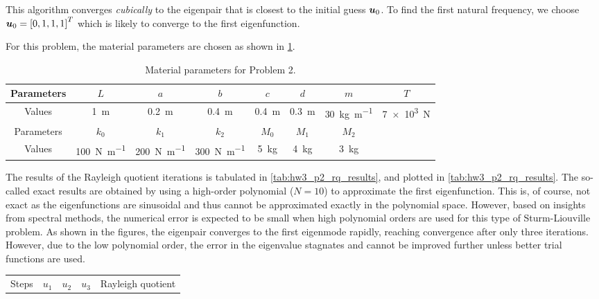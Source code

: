 \begin{enumerate}[(i)]
{    This algorithm converges \emph{cubically} to the eigenpair that is closest to the initial guess $\bm{u}_0$.
    To find the first natural frequency, we choose $\bm{u}_0 = {[0, 1, 1, 1]}^T$ which is likely to converge to the first eigenfunction.

    For this problem, the material parameters are chosen as shown in \cref{tab:hw3_p2_params}.
    \begin{table}[!ht]
        \centering
        \begin{tabular}{|c|c|c|c|c|c|c|c|}
            \hline
            Parameters & $L$ & $a$ & $b$ & $c$ & $d$ & $m$ & $T$ \\
            \hline
            Values & \qty{1}{\m} & \qty{0.2}{\m} & \qty{0.4}{\m} & \qty{0.4}{\m} & \qty{0.3}{\m} & \qty{30}{\kg\per\m} & \qty{7e3}{\newton} \\
            \hline
            Parameters & $k_0$ & $k_1$ & $k_2$ & $M_0$ & $M_1$ & $M_2$ & \\
            \hline 
            Values & \qty{100}{\newton\per\m} & \qty{200}{\newton\per\m} & \qty{300}{\newton\per\m} & \qty{5}{\kg} & \qty{4}{\kg} & \qty{3}{\kg} &  \\
            \hline
        \end{tabular}
        \caption{Material parameters for Problem 2. }
        \label{tab:hw3_p2_params}
    \end{table}
    The results of the Rayleigh quotient iterations is tabulated in \cref{tab:hw3_p2_rq_results}, and plotted in \cref{tab:hw3_p2_rq_results}.
    The so-called exact results are obtained by using a high-order polynomial ($N = 10$) to approximate the first eigenfunction. 
    This is, of course, not exact as the eigenfunctions are sinusoidal and thus cannot be approximated exactly in the polynomial space. 
    However, based on insights from spectral methods, the numerical error is expected to be small when high polynomial orders are used for this type of Sturm-Liouville problem. 
    As shown in the figures, the eigenpair converges to the first eigenmode rapidly, reaching convergence after only three iterations. 
    However, due to the low polynomial order, the error in the eigenvalue stagnates and cannot be improved further unless better trial functions are used. 
    \begin{table}[!ht]
        \centering
        \begin{tabular}{|c|c|c|c|c|}
            \hline
            Steps & $u_1$ & $u_2$ & $u_3$ & Rayleigh quotient \\

\end{tabular}
\end{table}}
\end{enumerate}
